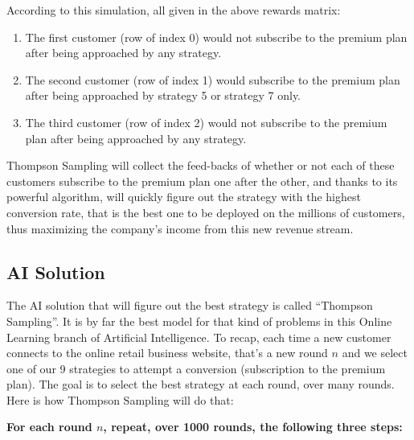 \documentclass[]{book}
\begin{document}
According to this simulation, all given in the above rewards matrix:

\begin{enumerate}
    \item The first customer (row of index 0) would not subscribe to the premium plan after being approached by any strategy.
    \item The second customer (row of index 1) would subscribe to the premium plan after being approached by strategy 5 or strategy 7 only.
    \item The third customer (row of index 2) would not subscribe to the premium plan after being approached by any strategy.
\end{enumerate}

Thompson Sampling will collect the feed-backs of whether or not each of these customers subscribe to the premium plan one after the other, and thanks to its powerful algorithm, will quickly figure out the strategy with the highest conversion rate, that is the best one to be deployed on the millions of customers, thus maximizing the company's income from this new revenue stream.

\subsection{AI Solution}

The AI solution that will figure out the best strategy is called ``Thompson Sampling''. It is by far the best model for that kind of problems in this Online Learning branch of Artificial Intelligence. To recap, each time a new customer connects to the online retail business website, that's a new round \(n\) and we select one of our 9 strategies to attempt a conversion (subscription to the premium plan). The goal is to select the best strategy at each round, over many rounds. Here is how Thompson Sampling will do that:

\textbf{For each round $n$, repeat, over 1000 rounds, the following three steps:}
\end{document}
